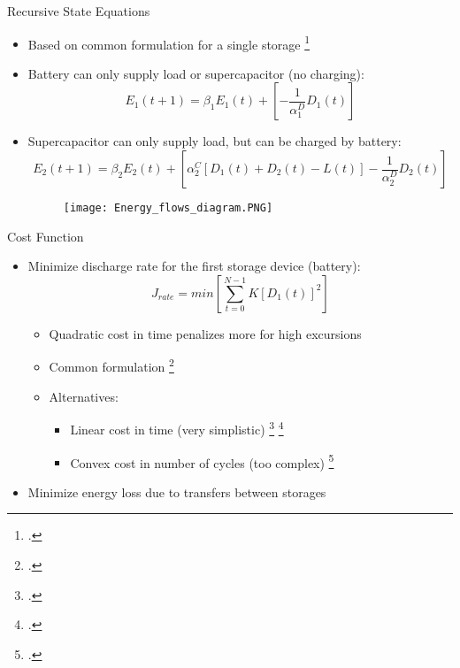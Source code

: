 \documentclass{beamer}
\DeclareMathOperator{\E}{\mathbb{E}}
\begin{document}
\begin{frame}{Recursive State Equations}
\begin{itemize}
\item Based on common formulation for a single storage \footcite{su2013modeling}
\item Battery can only supply load or supercapacitor (no charging):
\begin{equation}\label{eq:StateEq1}E_{1}(t+1)=\beta_{1}E_{1}(t)+\left[-\frac{1}{\alpha_{1}^{D}}D_{1}(t)\right] \end{equation}
\item Supercapacitor can only supply load, but can be charged by battery:
\begin{equation}\label{eq:StateEq2}E_{2}(t+1)=\beta_{2}E_{2}(t)+\left[\alpha_{2}^{C}[D_{1}(t)+D_{2}(t)-L(t)]-\frac{1}{\alpha_{2}^{D}}D_{2}(t)\right]\end{equation}
\begin{figure}
\texttt{[image: Energy\_flows\_diagram.PNG]}
\end{figure}
\end{itemize}
\end{frame}

\begin{frame}{Cost Function}
\begin{itemize}
\item Minimize discharge rate
for the first storage device (battery):
\begin{equation}J_{rate}=min\left[\sum_{t=0}^{N-1}K\left[D_{1}(t)\right]^{2}\right]\end{equation}
\begin{itemize}
\item Quadratic cost in time penalizes more for high excursions
\item Common formulation \footcite{bambang2014energy}
\item Alternatives:
\begin{itemize}
\item Linear cost in time (very simplistic) \footcite{bordin2017linear} \footcite{ru2013storage}
\item Convex cost in number of cycles (too complex) \footcite{shi2017optimal}
\end{itemize}
\end{itemize}

\item Minimize energy loss due to transfers between storages

\noindent
\scalebox{0.7}{
\begin{equation}
J_{loss}=\mathop{\E}_{L(t)} \Biggl\{min\left[\sum_{t=0}^{N-1}
(1-\alpha_{1}^{D})D_{1}(t)+
(1-\alpha_{2}^{C})[D_{1}(t)+D_{2}(t)-L(t)]+
(1-\alpha_{2}^{D})D_{2}(t)
\right]\Biggr\}
\end{equation}
}

\end{itemize}
\end{frame}
\end{document}
